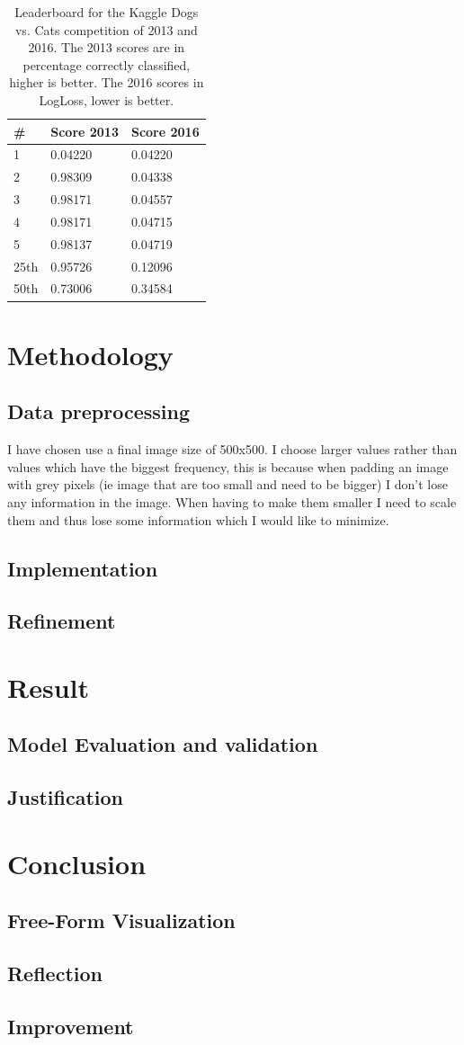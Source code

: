 \documentclass[11pt]{article}
\begin{document}
\begin{table}
\centering
\begin{tabular}{l | ll}
	\# & Score 2013 & Score 2016\\
	\hline
	1 & 0.04220 & 0.04220\\
	2 & 0.98309 & 0.04338\\
	3 & 0.98171 & 0.04557\\
	4 & 0.98171 & 0.04715\\
	5 & 0.98137 & 0.04719\\
	\hline
	25th & 0.95726 & 0.12096\\
	50th & 0.73006& 0.34584
\end{tabular}
\caption{Leaderboard for the Kaggle Dogs vs. Cats competition of 2013 and 2016. The 2013 scores are in percentage correctly classified, higher is better. The 2016 scores in LogLoss, lower is better.}
\label{leaderboard2013}
\end{table}

\section{Methodology}
\subsection{Data preprocessing}
I have chosen use a final image size of 500x500. I choose larger values rather than values which have the biggest frequency, this is because when padding an image with grey pixels (ie image that are too small and need to be bigger) I don't lose any information in the image. When having to make them smaller I need to scale them and thus lose some information which I would like to minimize.	
\subsection{Implementation}
\subsection{Refinement}
\section{Result}
\subsection{Model Evaluation and validation}
\subsection{Justification}
\section{Conclusion}
\subsection{Free-Form Visualization}
\subsection{Reflection}
\subsection{Improvement}
\end{document}
